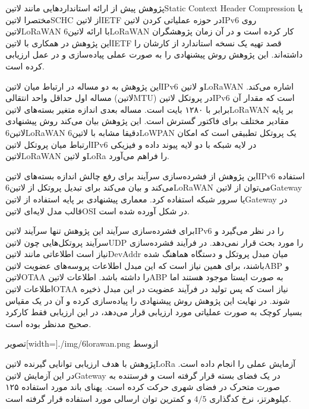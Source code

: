 پژوهش  پیش از ارائه استانداردهایی مانند ‌لاتین{Static Context Header Compression} یا مختصرا ‌لاتین{SCHC} از ‌لاتین{IETF} در حوزه عملیاتی کردن ‌لاتین{IPv6} روی ‌لاتین{LoRaWAN}
با ارائه ‌لاتین{6LoRaWAN} کار کرده است و در آن زمان پژوهشگران این پژوهش در همکاری با ‌لاتین{IETF} قصد تهیه یک نسخه استاندارد از کارشان را داشته‌اند. این پژوهش روش پیشنهادی را به صورت عملی پیاده‌سازی و در عمل ارزیابی کرده است.

این پژوهش به دو مساله در ارتباط میان ‌لاتین{IPv6} و ‌لاتین{LoRaWAN} اشاره می‌کند. مساله اول حداقل واحد انتقالی (‌لاتین{MTU}) در پروتکل ‌لاتین{IPv6} است که مقدار آن برابر با ۱۲۸۰ بایت است.
مساله بعدی اندازه متغیر بسته‌های ‌لاتین{LoRaWAN} بر پایه مقادیر مختلف برای فاکتور گسترش است. این پژوهش بیان می‌کند روش پیشنهادی ‌لاتین{6LoRaWAN}
دقیقا مشابه با ‌لاتین{6LoWPAN} یک پروتکل تطبیقی است که امکان ارتباط میان پروتکل ‌لاتین{IPv6} در لایه شبکه با دو لایه پیوند داده و فیزیکی ‌لاتین{LoRaWAN} و ‌لاتین{LoRa} را فراهم می‌آورد.

این پژوهش از فشرده‌سازی سرآیند برای رفع چالش اندازه بسته‌های ‌لاتین{IPv6} استفاده می‌کند و بیان می‌کند برای تبدیل پروتکل از ‌لاتین{6LoRaWAN} می‌توان از ‌لاتین{Gateway} یا سرور شبکه استفاده کرد.
معماری پیشنهادی بر پایه استفاده از ‌لاتین{Gateway} در قالب مدل لایه‌ای ‌لاتین{OSI} در شکل  آورده شده است.

برای فشرده‌سازی سرآیند این پژوهش تنها سرآیند ‌لاتین{IPv6} را در نظر می‌گیرد و سرآیند پروتکل‌هایی چون ‌لاتین{UDP} را مورد بحث قرار نمی‌دهد.
در فرآیند فشرده‌سازی نیاز است اطلاعاتی مانند ‌لاتین{DevAddr} میان مبدل پروتکل و دستگاه هماهنگ شده باشند، برای همین نیاز است که این مبدل اطلاعات پروسه‌های عضویت ‌لاتین{ABP} و ‌لاتین{OTAA}
را داشته باشد. اطلاعات ‌لاتین{ABP} به صورت ایستا موجود هستند اما اطلاعات ‌لاتین{OTAA} نیاز است که پس تولید در فرآیند عضویت در این مبدل ذخیره شوند.
در نهایت این پژوهش روش پیشنهادی را پیاده‌سازی کرده و آن در یک مقیاس بسیار کوچک به صورت عملیاتی مورد ارزیابی قرار می‌دهد، در این ارزیابی فقط کارکرد صحیح مدنظر بوده است.

‌تصویر[width=\textwidth]{./img/6lorawan.png}
‌ازوسط


پژوهش  با هدف ارزیابی توانایی گیرنده ‌لاتین{LoRa} آزمایش عملی را انجام داده است. در این آزمایش ‌لاتین{Gateway} در یک فضای بسته قرار گرفته است و فرستنده
به صورت متحرک در فضای شهری حرکت کرده است. پهنای باند مورد استفاده ۱۲۵ کیلوهرتز، نرخ کدگذاری $4/5$ و کمترین توان ارسالی مورد استفاده قرار گرفته است.

